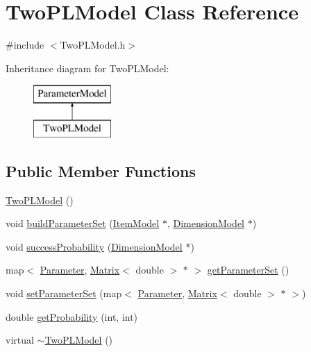 \hypertarget{classTwoPLModel}{}\section{Two\+P\+L\+Model Class Reference}
\label{classTwoPLModel}


{\ttfamily \#include $<$Two\+P\+L\+Model.\+h$>$}

Inheritance diagram for Two\+P\+L\+Model\+:\begin{figure}[H]
\begin{center}
\leavevmode
\includegraphics[height=2.000000cm]{classTwoPLModel}
\end{center}
\end{figure}
\subsection*{Public Member Functions}
\begin{DoxyCompactItemize}
\item 
\hyperlink{classTwoPLModel_aba5d80aa87abe92124da11338608b582}{Two\+P\+L\+Model} ()
\item 
void \hyperlink{classTwoPLModel_aabf6941cbcad7f5a73af30725a4bcb31}{build\+Parameter\+Set} (\hyperlink{classItemModel}{Item\+Model} $\ast$, \hyperlink{classDimensionModel}{Dimension\+Model} $\ast$)
\item 
void \hyperlink{classTwoPLModel_a3fb1a6228da24ce1ee7a2bedb6a2f2e7}{success\+Probability} (\hyperlink{classDimensionModel}{Dimension\+Model} $\ast$)
\item 
map$<$ \hyperlink{ParameterModel_8h_a04ed5b8f1f3adf7af1d5092fae847e90}{Parameter}, \hyperlink{singletonMatrix}{Matrix}$<$ double $>$ $\ast$ $>$ \hyperlink{classTwoPLModel_a954cc66bfa5e79838130c09ff2d96edf}{get\+Parameter\+Set} ()
\item 
void \hyperlink{classTwoPLModel_a1a699dcb6b2890e1b2574778c2ec688e}{set\+Parameter\+Set} (map$<$ \hyperlink{ParameterModel_8h_a04ed5b8f1f3adf7af1d5092fae847e90}{Parameter}, \hyperlink{singletonMatrix}{Matrix}$<$ double $>$ $\ast$ $>$)
\item 
double \hyperlink{classTwoPLModel_a89a707b9813ff8c8999267604cc67c62}{get\+Probability} (int, int)
\item 
virtual \hyperlink{classTwoPLModel_aeb4234c3d42b00416c7799027754dde5}{$\sim$\+Two\+P\+L\+Model} ()
\end{DoxyCompactItemize}
